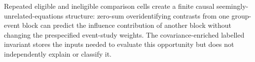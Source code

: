 Repeated eligible and ineligible comparison cells create a finite causal seemingly-unrelated-equations structure: zero-sum overidentifying contrasts from one group-event block can predict the influence contribution of another block without changing the prespecified event-study weights. The covariance-enriched labelled invariant stores the inputs needed to evaluate this opportunity but does not independently explain or classify it.